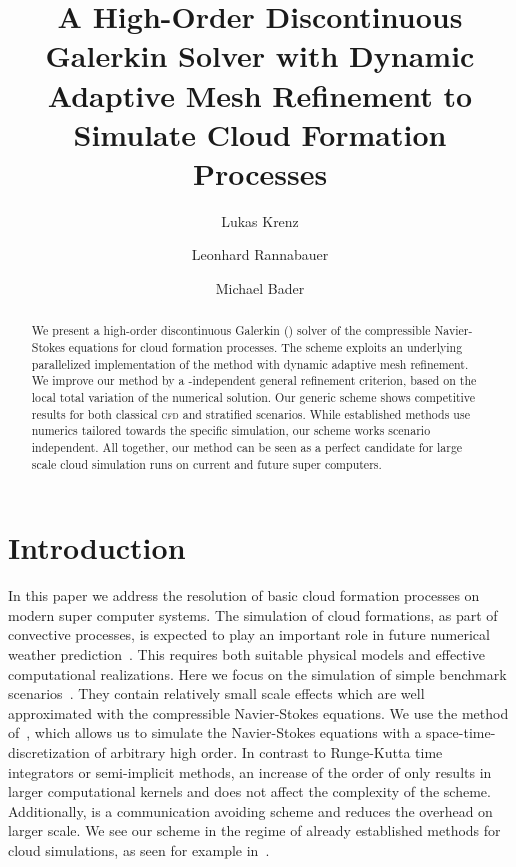 \documentclass[runningheads]{llncs}
\title{A High-Order Discontinuous Galerkin Solver with Dynamic Adaptive Mesh Refinement to Simulate Cloud Formation Processes }
\author{Lukas Krenz \and Leonhard Rannabauer \and Michael Bader}
\institute{Department of Informatics, Technical University of Munich\\
  \email{lukas.krenz@in.tum.de}, \email{rannabauer@in.tum.de}, \email{bader@in.tum.de}
\vspace*{-0.2cm}
} %
\begin{document}
\maketitle 
\begin{abstract}
  We present a high-order discontinuous Galerkin (\dg{}) solver of the compressible Navier-Stokes equations for cloud formation processes.
  The scheme exploits an underlying parallelized implementation of the \aderdg{} method with dynamic adaptive mesh refinement. 
  We improve our method by a \pde{}-independent general refinement criterion, based on the local total variation of the numerical solution.
  Our generic scheme shows competitive results for both classical \textsc{cfd} and stratified scenarios.
  While established methods use numerics tailored towards the specific simulation, our scheme works scenario independent.
  All together, our method can be seen as a perfect candidate for large scale cloud simulation runs on current and future super computers.

\end{abstract}
\section{Introduction}
In this paper we address the resolution of basic cloud formation processes on modern super computer systems.
The simulation of cloud formations, as part of convective processes, is expected to play an important role in future numerical weather prediction~\cite{bauer2015quiet}.
This requires both suitable physical models and effective computational realizations. 
Here we focus on the simulation of simple benchmark scenarios~\cite{giraldo2008study}.
They contain relatively small scale effects which are well approximated with the compressible Navier-Stokes equations.
We use the \aderdg{} method of~\cite{dumbser2008unified}, which allows us to simulate the Navier-Stokes equations with a space-time-discretization of arbitrary high order.
In contrast to Runge-Kutta time integrators or semi-implicit methods, an increase of the order of \aderdg{} only results in larger computational kernels and does not affect the complexity of the scheme.
Additionally, \aderdg{} is a communication avoiding scheme and reduces the overhead on larger scale.
We see our scheme in the regime of already established methods for cloud simulations, as seen for example in~\cite{giraldo2008study,muller2010adaptive,muller2018strong}.
\end{document}
